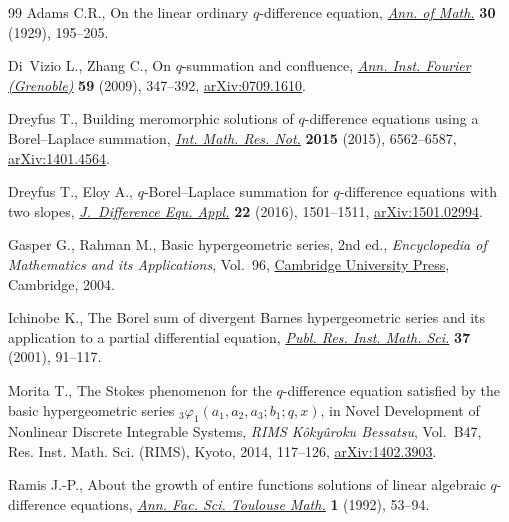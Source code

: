 \documentclass[11pt]{article}
\numberwithin{equation}{section}
\begin{document}
\begin{thebibliography}{99}
Adams C.R., On the linear ordinary {$q$}-difference equation, \href{https://doi.org/10.2307/1968274}{\textit{Ann. of
 Math.}} \textbf{30} (1929), 195--205.

Di~Vizio L., Zhang C., On {$q$}-summation and confluence, \href{https://doi.org/10.5802/aif.2433}{\textit{Ann. Inst.
 Fourier (Grenoble)}} \textbf{59} (2009), 347--392, \href{https://arxiv.org/abs/0709.1610}{arXiv:0709.1610}.

Dreyfus T., Building meromorphic solutions of {$q$}-difference equations using
 a {B}orel--{L}aplace summation, \href{https://doi.org/10.1093/imrn/rnu137}{\textit{Int. Math. Res. Not.}} \textbf{2015}
 (2015), 6562--6587, \href{https://arxiv.org/abs/1401.4564}{arXiv:1401.4564}.

Dreyfus T., Eloy A., {$q$}-{B}orel--{L}aplace summation for {$q$}-difference
 equations with two slopes, \href{https://doi.org/10.1080/10236198.2016.1209192}{\textit{J.~Difference Equ. Appl.}} \textbf{22}
 (2016), 1501--1511, \href{https://arxiv.org/abs/1501.02994}{arXiv:1501.02994}.

Gasper G., Rahman M., Basic hypergeometric series, 2nd ed., \textit{Encyclopedia of
 Mathematics and its Applications}, Vol.~96, \href{https://doi.org/10.1017/CBO9780511526251}{Cambridge University
 Press}, Cambridge, 2004.

Ichinobe K., The {B}orel sum of divergent {B}arnes hypergeometric series and
 its application to a partial differential equation, \href{https://doi.org/10.2977/prims/1145476691}{\textit{Publ. Res. Inst.
 Math. Sci.}} \textbf{37} (2001), 91--117.

Morita T., The {S}tokes phenomenon for the {$q$}-difference equation satisfied
 by the basic hypergeometric series {${}_3\varphi_1(a_1,a_2,a_3;b_1;q,x)$}, in
 Novel Development of Nonlinear Discrete Integrable Systems, \textit{RIMS
 K\^{o}ky\^{u}roku Bessatsu}, Vol.~B47, Res. Inst. Math. Sci. (RIMS), Kyoto, 2014,
 117--126, \href{https://arxiv.org/abs/1402.3903}{arXiv:1402.3903}.

Ramis J.-P., About the growth of entire functions solutions of linear algebraic
 {$q$}-difference equations, \href{https://doi.org/10.5802/afst.739}{\textit{Ann. Fac. Sci. Toulouse Math.}} \textbf{1}
 (1992), 53--94.


\end{thebibliography}
\end{document}
